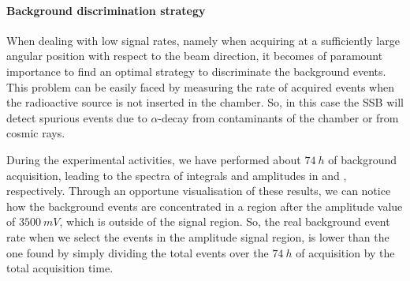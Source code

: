 \documentclass[../../main/main.tex]{subfiles}
\begin{document}
\paragraph{Background discrimination strategy}
When dealing with low signal rates, namely when acquiring at a sufficiently large angular position with respect to the beam direction, it becomes of paramount importance to find an optimal strategy to discriminate the background events. This problem can be easily faced by measuring the rate of acquired events when the radioactive source is not inserted in the chamber. So, in this case the SSB will detect spurious events due to \( \alpha \)-decay from contaminants of the chamber or from cosmic rays.

During the experimental activities, we have performed about \( 74 \ \si{h} \) of background acquisition, leading to the spectra of integrals and amplitudes in  and , respectively. Through an opportune visualisation of these results, we can notice how the background events are concentrated in a region after the amplitude value of \( 3500 \ \si{mV} \), which is outside of the signal region. So, the real background event rate when we select the events in the amplitude signal region, is lower than the one found by simply dividing the total events over the \( 74 \ \si{h} \) of acquisition by the total acquisition time.
\end{document}

